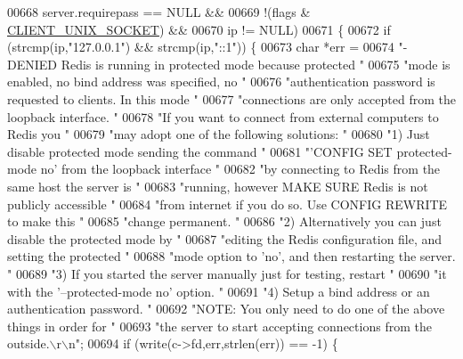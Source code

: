 \begin{DoxyCode}
{{{{{00668         server.requirepass == NULL &&
00669         !(flags & \hyperlink{server_8h_ae19f45757ef3ffb2f3abb86cbc3b67a2}{CLIENT\_UNIX\_SOCKET}) &&
00670         ip != NULL)
00671     \{
00672         \textcolor{keywordflow}{if} (strcmp(ip,\textcolor{stringliteral}{"127.0.0.1"}) && strcmp(ip,\textcolor{stringliteral}{"::1"})) \{
00673             \textcolor{keywordtype}{char} *err =
00674                 \textcolor{stringliteral}{"-DENIED Redis is running in protected mode because protected "}
00675                 \textcolor{stringliteral}{"mode is enabled, no bind address was specified, no "}
00676                 \textcolor{stringliteral}{"authentication password is requested to clients. In this mode "}
00677                 \textcolor{stringliteral}{"connections are only accepted from the loopback interface. "}
00678                 \textcolor{stringliteral}{"If you want to connect from external computers to Redis you "}
00679                 \textcolor{stringliteral}{"may adopt one of the following solutions: "}
00680                 \textcolor{stringliteral}{"1) Just disable protected mode sending the command "}
00681                 \textcolor{stringliteral}{"'CONFIG SET protected-mode no' from the loopback interface "}
00682                 \textcolor{stringliteral}{"by connecting to Redis from the same host the server is "}
00683                 \textcolor{stringliteral}{"running, however MAKE SURE Redis is not publicly accessible "}
00684                 \textcolor{stringliteral}{"from internet if you do so. Use CONFIG REWRITE to make this "}
00685                 \textcolor{stringliteral}{"change permanent. "}
00686                 \textcolor{stringliteral}{"2) Alternatively you can just disable the protected mode by "}
00687                 \textcolor{stringliteral}{"editing the Redis configuration file, and setting the protected "}
00688                 \textcolor{stringliteral}{"mode option to 'no', and then restarting the server. "}
00689                 \textcolor{stringliteral}{"3) If you started the server manually just for testing, restart "}
00690                 \textcolor{stringliteral}{"it with the '--protected-mode no' option. "}
00691                 \textcolor{stringliteral}{"4) Setup a bind address or an authentication password. "}
00692                 \textcolor{stringliteral}{"NOTE: You only need to do one of the above things in order for "}
00693                 \textcolor{stringliteral}{"the server to start accepting connections from the outside.\(\backslash\)r\(\backslash\)n"};
00694             \textcolor{keywordflow}{if} (write(c->fd,err,strlen(err)) == -1) \{
}}}}}
\end{DoxyCode}
